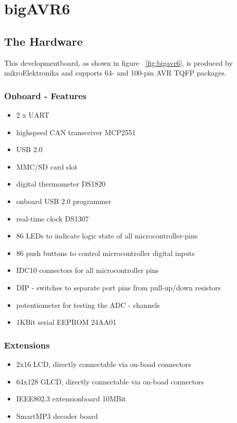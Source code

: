 
\chapter{bigAVR6} \label{chapter:bigAVR6}


\section{The Hardware}

This developmentboard, as shown in figure ~\ref{fig:bigavr6}, is produced by mikroElektronika and supports 64- and 100-pin AVR TQFP packages.

\subsection{Onboard - Features}

\begin{itemize}
 \item 2 x UART
 \item highspeed CAN transceiver MCP2551
 \item USB 2.0
 \item MMC/SD card slot
 \item digital thermometer DS1820
 \item onboard USB 2.0 programmer
 \item real-time clock DS1307
 \item 86 LEDs to indicate logic state of all microcontroller-pins
 \item 86 push buttons to control microcontroller digital inputs
 \item IDC10 connectors for all microcontroller pins
 \item DIP - switches to separate port pins from pull-up/down resistors
 \item potentiometer for testing the ADC - channels
 \item 1KBit serial EEPROM 24AA01
\end{itemize}

\subsection{Extensions}

\begin{itemize}
 \item 2x16 LCD, directly connectable via on-boad connectors
 \item 64x128 GLCD, directly connectable via on-boad connectors
 \item IEEE802.3 extensionboard 10MBit
 \item SmartMP3 decoder board
\end{itemize}


